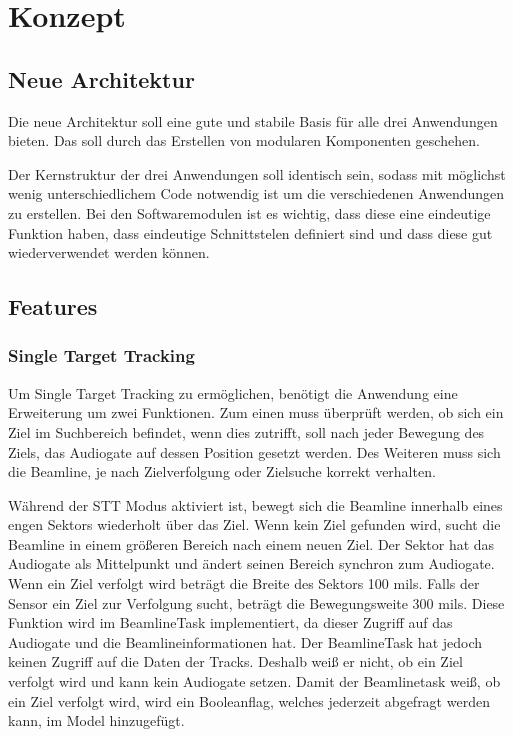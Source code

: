 \chapter{Konzept}

\section{Neue Architektur}
Die neue Architektur soll eine gute und stabile Basis für alle drei Anwendungen bieten. Das soll durch das Erstellen von modularen Komponenten geschehen. 

Der Kernstruktur der drei Anwendungen soll identisch sein, sodass mit möglichst wenig unterschiedlichem Code notwendig ist um die verschiedenen 
Anwendungen zu erstellen. Bei den Softwaremodulen ist es wichtig, dass diese eine eindeutige Funktion haben, dass eindeutige Schnittstelen definiert sind
 und dass diese gut wiederverwendet werden können. 






\newpage
\section{Features}

\subsection{Single Target Tracking}
Um Single Target Tracking zu ermöglichen, benötigt die Anwendung eine Erweiterung um zwei Funktionen. Zum einen muss überprüft werden, ob sich ein Ziel 
im Suchbereich befindet, wenn dies zutrifft, soll nach jeder Bewegung des Ziels, das Audiogate auf dessen Position gesetzt werden. Des Weiteren muss sich 
die Beamline, je nach Zielverfolgung oder Zielsuche korrekt verhalten.

Während der STT Modus aktiviert ist, bewegt sich die Beamline innerhalb eines engen Sektors wiederholt über das Ziel. Wenn kein Ziel gefunden wird, sucht
die Beamline in einem größeren Bereich nach einem neuen Ziel. Der Sektor hat das Audiogate als Mittelpunkt und ändert seinen Bereich synchron zum 
Audiogate. Wenn ein Ziel verfolgt wird beträgt die Breite des Sektors 100 mils. Falls der Sensor ein Ziel zur Verfolgung sucht, beträgt die 
Bewegungsweite 300 mils. Diese Funktion wird im BeamlineTask implementiert, da dieser Zugriff auf das Audiogate und die Beamlineinformationen hat. Der 
BeamlineTask hat jedoch keinen Zugriff auf die Daten der Tracks. Deshalb weiß er nicht, ob ein Ziel verfolgt wird und kann kein Audiogate setzen. Damit 
der Beamlinetask weiß, ob ein Ziel verfolgt wird, wird ein Booleanflag, welches jederzeit abgefragt werden kann, im Model hinzugefügt.

